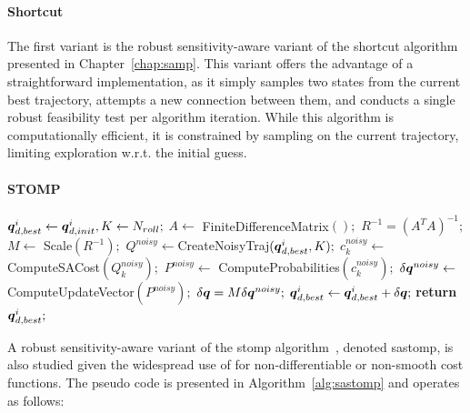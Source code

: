 \paragraph{Shortcut}

The first variant is the robust sensitivity-aware variant of the shortcut algorithm~\cite{cShortcut} presented in Chapter~\ref{chap:samp}.
This variant offers the advantage of a straightforward implementation, as it simply samples two states from the current best trajectory, attempts a new connection between them, and conducts a single robust feasibility test per algorithm iteration.
While this algorithm is computationally efficient, it is constrained by sampling on the current trajectory, limiting exploration w.r.t. the initial guess.

\paragraph{STOMP}

\begin{algorithm}[h!]
    \caption{ [$\q_{d,init}^{i}, N_{roll}$]}\label{alg:sastomp}
    \begin{algorithmic}[1]
    \State $\boldsymbol{q}_{d,best}^{i} \gets \boldsymbol{q}_{d,init}^{i}, K \gets N_{roll};$
    \State $A \gets$ FiniteDifferenceMatrix$();$
    \State $R^{-1} = (A^TA)^{-1};$
    \State $M \gets$ Scale$(R^{-1});$
        \State $Q^{noisy} \gets $CreateNoisyTraj$(\boldsymbol{q}_{d,best}^{i}, K);$
            \State $c_k^{noisy} \gets$ ComputeSACost$(Q_k^{noisy});$
            \State $P^{noisy} \gets $ ComputeProbabilities$(c_k^{noisy});$
        \EndFor
        \State $\delta \boldsymbol{q}^{noisy} \gets$ ComputeUpdateVector$(P^{noisy});$
        \State $\delta \boldsymbol{q} = M \delta \boldsymbol{q}^{noisy};$
        \State $\boldsymbol{q}_{d,best}^{i} \gets \boldsymbol{q}_{d,best}^{i} + \delta \boldsymbol{q};$
    \EndWhile
    \State \textbf{return} $\boldsymbol{q}_{d,best}^{i};$
    \end{algorithmic}
\end{algorithm}

A robust sensitivity-aware variant of the \gls{stomp} algorithm~\cite{cSTOMP}, denoted \gls{sastomp}, is also studied given the widespread use of  for non-differentiable or non-smooth cost functions.
The pseudo code is presented in Algorithm~\ref{alg:sastomp} and operates as follows:

